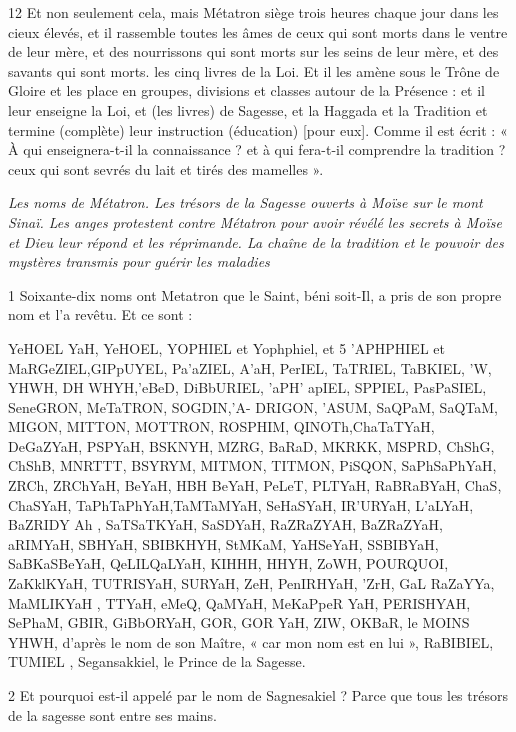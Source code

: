 \par 12 Et non seulement cela, mais Métatron siège trois heures chaque jour dans les cieux élevés, et il rassemble toutes les âmes de ceux qui sont morts dans le ventre de leur mère, et des nourrissons qui sont morts sur les seins de leur mère, et des savants qui sont morts. les cinq livres de la Loi. Et il les amène sous le Trône de Gloire et les place en groupes, divisions et classes autour de la Présence : et il leur enseigne la Loi, et (les livres) de Sagesse, et la Haggada et la Tradition et termine (complète) leur instruction (éducation) [pour eux]. Comme il est écrit : « À qui enseignera-t-il la connaissance ? et à qui fera-t-il comprendre la tradition ? ceux qui sont sevrés du lait et tirés des mamelles ».



\par \textit{Les noms de Métatron. Les trésors de la Sagesse ouverts à Moïse sur le mont Sinaï. Les anges protestent contre Métatron pour avoir révélé les secrets à Moïse et Dieu leur répond et les réprimande. La chaîne de la tradition et le pouvoir des mystères transmis pour guérir les maladies}

\par 1 Soixante-dix noms ont Metatron que le Saint, béni soit-Il, a pris de son propre nom et l'a revêtu. Et ce sont :

\par YeHOEL YaH, YeHOEL, YOPHIEL et Yophphiel, et 5 'APHPHIEL et MaRGeZIEL,GIPpUYEL, Pa'aZIEL, A'aH, PerIEL, TaTRIEL, TaBKIEL, 'W, YHWH, DH WHYH,'eBeD, DiBbURIEL, 'aPH' apIEL, SPPIEL, PasPaSIEL, SeneGRON, MeTaTRON, SOGDIN,'A- DRIGON, 'ASUM, SaQPaM, SaQTaM, MIGON, MITTON, MOTTRON, ROSPHIM, QINOTh,ChaTaTYaH, DeGaZYaH, PSPYaH, BSKNYH, MZRG, BaRaD, MKRKK, MSPRD, ChShG, ChShB, MNRTTT, BSYRYM, MITMON, TITMON, PiSQON, SaPhSaPhYaH, ZRCh, ZRChYaH, BeYaH, HBH BeYaH, PeLeT, PLTYaH, RaBRaBYaH, ChaS, ChaSYaH, TaPhTaPhYaH,TaMTaMYaH, SeHaSYaH, IR'URYaH, L'aLYaH, BaZRIDY Ah , SaTSaTKYaH, SaSDYaH, RaZRaZYAH, BaZRaZYaH, aRIMYaH, SBHYaH, SBIBKHYH, StMKaM, YaHSeYaH, SSBIBYaH, SaBKaSBeYaH, QeLILQaLYaH, KIHHH, HHYH, ZoWH, POURQUOI, ZaKklKYaH, TUTRISYaH, SURYaH, ZeH, PenIRHYaH, 'ZrH, GaL RaZaYYa, MaMLIKYaH , TTYaH, eMeQ, QaMYaH, MeKaPpeR YaH, PERISHYAH, SePhaM, GBIR, GiBbORYaH, GOR, GOR YaH, ZIW, OKBaR, le MOINS YHWH, d'après le nom de son Maître, « car mon nom est en lui », RaBIBIEL, TUMIEL , Segansakkiel, le Prince de la Sagesse.

\par 2 Et pourquoi est-il appelé par le nom de Sagnesakiel ? Parce que tous les trésors de la sagesse sont entre ses mains.


